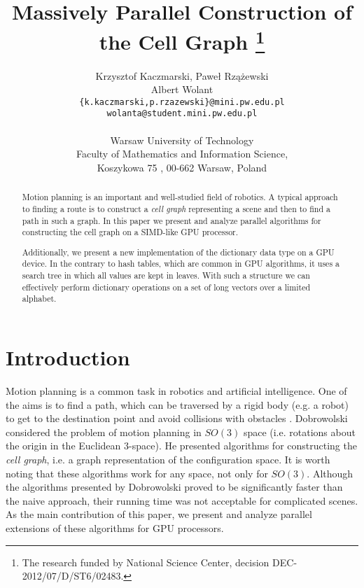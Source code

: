 \documentclass[a4paper]{article}
\begin{document}
\title{Massively Parallel Construction of the Cell Graph
\footnote{The research funded by National Science Center, decision  DEC-2012/07/D/ST6/02483.}
}

\author{
Krzysztof Kaczmarski, Pawe{\l} Rz{\k a}{\. z}ewski  \\
Albert Wolant\\
\texttt{\{k.kaczmarski,p.rzazewski\}@mini.pw.edu.pl} \\
\texttt{wolanta@student.mini.pw.edu.pl} \\ \\
Warsaw University of Technology \\
Faculty of Mathematics and Information Science,\\
Koszykowa 75 , 00-662 Warsaw, Poland
}
\date{ }
\maketitle


\begin{abstract}
Motion planning is an important and well-studied field of robotics. A typical approach to finding a route is to construct a {\em cell graph} representing a scene and then to find a path in such a graph. 
In this paper we present and analyze parallel algorithms for constructing the cell graph on a SIMD-like GPU processor.

Additionally, we present a new implementation of the dictionary data type on a GPU device. In the contrary to hash tables, which are common in GPU algorithms, it uses a search tree in which all values are kept in leaves. With such a structure we can effectively perform dictionary operations on a set of long vectors over a limited alphabet.
\end{abstract}


\maketitle


\section{Introduction}

Motion planning is a common task in robotics and artificial intelligence. One of the aims is to find a path, which can be traversed by a rigid body (e.g. a robot) to get to the destination point and avoid collisions with obstacles \cite{Hwang}.
Dobrowolski \cite{DBLP:conf/sii/Dobrowolski13} considered the problem of motion planning in $SO(3)$ space (i.e. rotations about the origin in the Euclidean 3-space). He presented algorithms for constructing the {\em cell graph}, i.e. a graph representation of the configuration space. It is worth noting that these algorithms work for any space, not only for $SO(3)$. 
Although the algorithms presented by Dobrowolski proved to be significantly faster than the naive approach, their running time was not acceptable for complicated scenes. As the main contribution of this paper, we present and analyze parallel extensions of these algorithms for GPU processors. 
\end{document}
